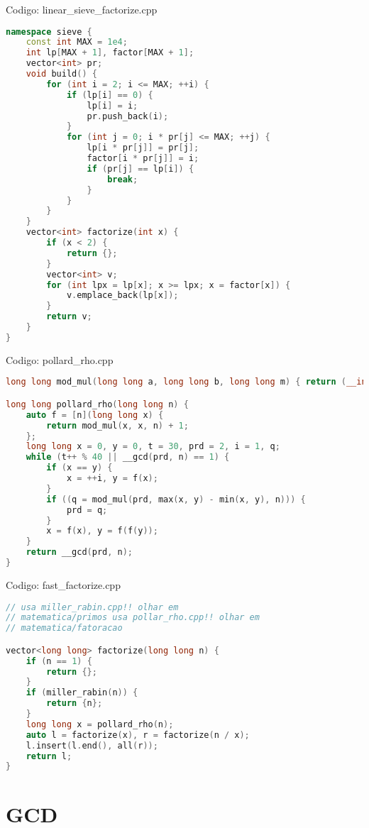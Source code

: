 \documentclass[10pt, a4paper, oneside]{book}
\begin{document}
Codigo: linear\_sieve\_factorize.cpp

\begin{lstlisting}[language=C++]
namespace sieve {
    const int MAX = 1e4;
    int lp[MAX + 1], factor[MAX + 1];
    vector<int> pr;
    void build() {
        for (int i = 2; i <= MAX; ++i) {
            if (lp[i] == 0) {
                lp[i] = i;
                pr.push_back(i);
            }
            for (int j = 0; i * pr[j] <= MAX; ++j) {
                lp[i * pr[j]] = pr[j];
                factor[i * pr[j]] = i;
                if (pr[j] == lp[i]) {
                    break;
                }
            }
        }
    }
    vector<int> factorize(int x) {
        if (x < 2) {
            return {};
        }
        vector<int> v;
        for (int lpx = lp[x]; x >= lpx; x = factor[x]) {
            v.emplace_back(lp[x]);
        }
        return v;
    }
}
\end{lstlisting}
\hfill

Codigo: pollard\_rho.cpp

\begin{lstlisting}[language=C++]
long long mod_mul(long long a, long long b, long long m) { return (__int128)a * b % m; }

long long pollard_rho(long long n) {
    auto f = [n](long long x) {
        return mod_mul(x, x, n) + 1;
    };
    long long x = 0, y = 0, t = 30, prd = 2, i = 1, q;
    while (t++ % 40 || __gcd(prd, n) == 1) {
        if (x == y) {
            x = ++i, y = f(x);
        }
        if ((q = mod_mul(prd, max(x, y) - min(x, y), n))) {
            prd = q;
        }
        x = f(x), y = f(f(y));
    }
    return __gcd(prd, n);
}
\end{lstlisting}
\hfill

Codigo: fast\_factorize.cpp

\begin{lstlisting}[language=C++]
// usa miller_rabin.cpp!! olhar em
// matematica/primos usa pollar_rho.cpp!! olhar em
// matematica/fatoracao

vector<long long> factorize(long long n) {
    if (n == 1) {
        return {};
    }
    if (miller_rabin(n)) {
        return {n};
    }
    long long x = pollard_rho(n);
    auto l = factorize(x), r = factorize(n / x);
    l.insert(l.end(), all(r));
    return l;
}
\end{lstlisting}
\hfill

\section{GCD}
\end{document}

